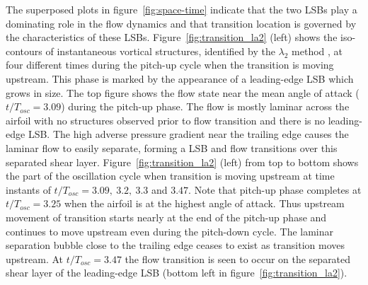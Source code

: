 The superposed plots in figure~\ref{fig:space-time} indicate that the two LSBs play a dominating role in the flow dynamics and that transition location is governed by the characteristics of these LSBs. Figure~\ref{fig:transition_la2} (left) shows the iso-contours of instantaneous vortical structures, identified by the $\lambda_{2}$ method \citep{jeong95}, at four different times during the pitch-up cycle when the transition is moving upstream. This phase is marked by the appearance of a leading-edge LSB which grows in size. The top figure shows the flow state near the mean angle of attack ($t/T_{osc}=3.09$) during the pitch-up phase. The flow is mostly laminar across the airfoil with no structures observed prior to flow transition and there is no leading-edge LSB. The high adverse pressure gradient near the trailing edge causes the laminar flow to easily separate, forming a LSB and flow transitions over this separated shear layer. Figure~\ref{fig:transition_la2} (left) from top to bottom shows the part of the oscillation cycle when transition is moving upstream at time instants of $t/T_{osc}=3.09,\ 3.2,\ 3.3$ and $3.47$. Note that pitch-up phase completes at $t/T_{osc}=3.25$ when the airfoil is at the highest angle of attack. Thus upstream movement of transition starts nearly at the end of the pitch-up phase and continues to move upstream even during the pitch-down cycle. The laminar separation bubble close to the trailing edge ceases to exist as transition moves upstream. At $t/T_{osc}=3.47$ the flow transition is seen to occur on the separated shear layer of the leading-edge LSB (bottom left in figure~\ref{fig:transition_la2}).
